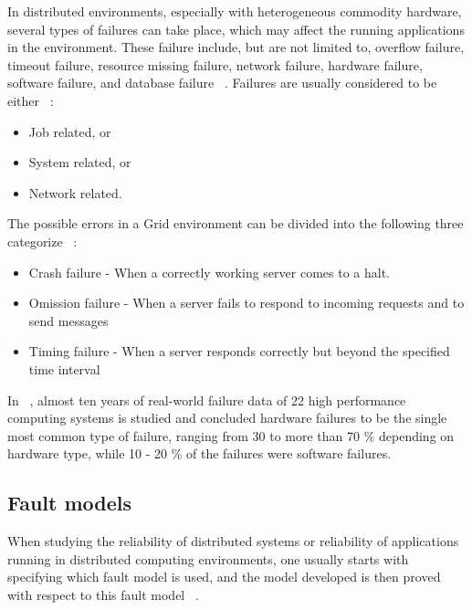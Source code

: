 \documentclass{cslthse-msc}
\begin{document}
In distributed environments, especially with heterogeneous commodity hardware, several types of failures can take place, which may affect the running applications in the environment. These failure include, but are not limited to, overflow failure, timeout failure, resource missing failure, network failure, hardware failure, software failure, and database failure ~\cite{cloudServiceRel}. Failures are usually considered to be either ~\cite{evalOfGridRel}:

\begin{itemize}
	\item Job related, or
	\item System related, or
	\item Network related.
\end{itemize}

The possible errors in a Grid environment can be divided into the following three categorize ~\cite{effTaskReplMobGrid}:
\begin{itemize}
	\item Crash failure - When a correctly working server comes to a halt.
	\item Omission failure - When a server fails to respond to incoming requests and to send messages
	\item Timing failure - When a server responds correctly but beyond the specified time interval
\end{itemize}

In ~\cite{studyOfFailures}, almost ten years of real-world failure data of 22 high performance computing systems is studied and concluded hardware failures to be the single most common type of failure, ranging from 30 to more than 70 \% depending on hardware type, while 10 - 20 \% of the failures were software failures.

\subsection{Fault models} \label{subsec:background_fault_models}
When studying the reliability of distributed systems or reliability of applications running in distributed computing environments, one usually starts with specifying which fault model is used, and the model developed is then proved with respect to this fault model ~\cite{faultTolerantFundamentals}.
\end{document}
